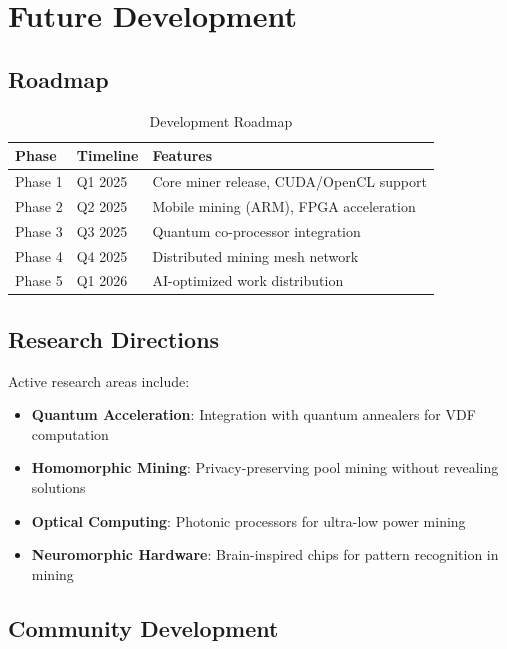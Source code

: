 \documentclass[11pt,a4paper]{article}
\begin{document}
\section{Future Development}

\subsection{Roadmap}

\begin{table}[H]
\centering
\begin{tabular}{|l|l|p{7cm}|}
\hline
\textbf{Phase} & \textbf{Timeline} & \textbf{Features} \\
\hline
Phase 1 & Q1 2025 & Core miner release, CUDA/OpenCL support \\
Phase 2 & Q2 2025 & Mobile mining (ARM), FPGA acceleration \\
Phase 3 & Q3 2025 & Quantum co-processor integration \\
Phase 4 & Q4 2025 & Distributed mining mesh network \\
Phase 5 & Q1 2026 & AI-optimized work distribution \\
\hline
\end{tabular}
\caption{Development Roadmap}
\end{table}

\subsection{Research Directions}

Active research areas include:

\begin{itemize}
    \item \textbf{Quantum Acceleration}: Integration with quantum annealers for VDF computation
    \item \textbf{Homomorphic Mining}: Privacy-preserving pool mining without revealing solutions
    \item \textbf{Optical Computing}: Photonic processors for ultra-low power mining
    \item \textbf{Neuromorphic Hardware}: Brain-inspired chips for pattern recognition in mining
\end{itemize}

\subsection{Community Development}
\end{document}
